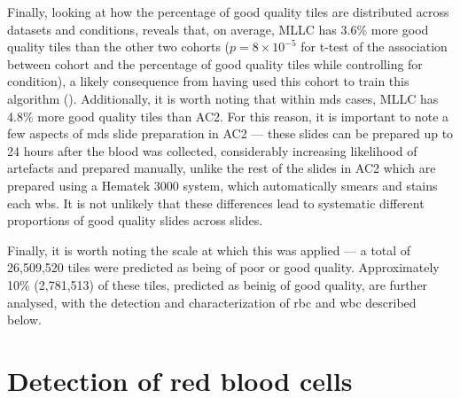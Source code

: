 \begin{figure}[!ht]
    \label{fig:sharpness-distribution}
\end{figure}

Finally, looking at how the percentage of good quality tiles are distributed across datasets and conditions, reveals that, on average, MLLC has 3.6\% more good quality tiles than the other two cohorts ($p = 8 \times 10^{-5}$ for t-test of the association between cohort and the percentage of good quality tiles while controlling for condition), a likely consequence from having used this cohort to train this algorithm (). Additionally, it is worth noting that within \ac{mds} cases, MLLC has 4.8\% more good quality tiles than AC2. For this reason, it is important to note a few aspects of \ac{mds} slide preparation in AC2 --- these slides can be prepared up to 24 hours after the blood was collected, considerably increasing likelihood of artefacts \cite{Bain2005-zg,Narasimha2008-fh} and prepared manually, unlike the rest of the slides in AC2 which are prepared using a Hematek 3000 system, which automatically smears and stains each \ac{wbs}. It is not unlikely that these differences lead to systematic different proportions of good quality slides across slides.

\begin{figure}[!ht]
    \label{fig:quality-percentage-distribution}
\end{figure}

Finally, it is worth noting the scale at which this was applied --- a total of 26,509,520 tiles were predicted as being of poor or good quality. Approximately 10\% (2,781,513) of these tiles, predicted as beinig of good quality, are further analysed, with the detection and characterization of \ac{rbc} and \ac{wbc} described below.

\section{Detection of red blood cells}

